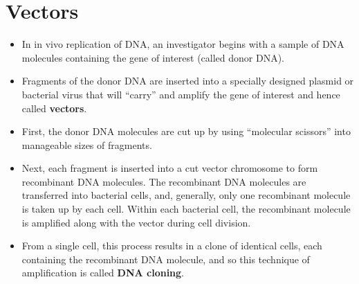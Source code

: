 \documentclass[11pt,dvipsnames,ignorenonframetext,aspectratio=169]{beamer}
\providecommand{\tightlist}{%
  \setlength{\itemsep}{0pt}\setlength{\parskip}{0pt}}
\begin{document}
\hypertarget{vectors}{%
\section{Vectors}\label{vectors}}

\begin{frame}{}
\protect\hypertarget{section-15}{}
\begin{itemize}
\tightlist
\item
  In in vivo replication of DNA, an investigator begins with a sample of
  DNA molecules containing the gene of interest (called donor DNA).
\item
  Fragments of the donor DNA are inserted into a specially designed
  plasmid or bacterial virus that will ``carry'' and amplify the gene of
  interest and hence called \textbf{vectors}.
\item
  First, the donor DNA molecules are cut up by using ``molecular
  scissors'' into manageable sizes of fragments.
\item
  Next, each fragment is inserted into a cut vector chromosome to form
  recombinant DNA molecules. The recombinant DNA molecules are
  transferred into bacterial cells, and, generally, only one recombinant
  molecule is taken up by each cell. Within each bacterial cell, the
  recombinant molecule is amplified along with the vector during cell
  division.
\item
  From a single cell, this process results in a clone of identical
  cells, each containing the recombinant DNA molecule, and so this
  technique of amplification is called \textbf{DNA cloning}.
\end{itemize}
\end{frame}
\end{document}
